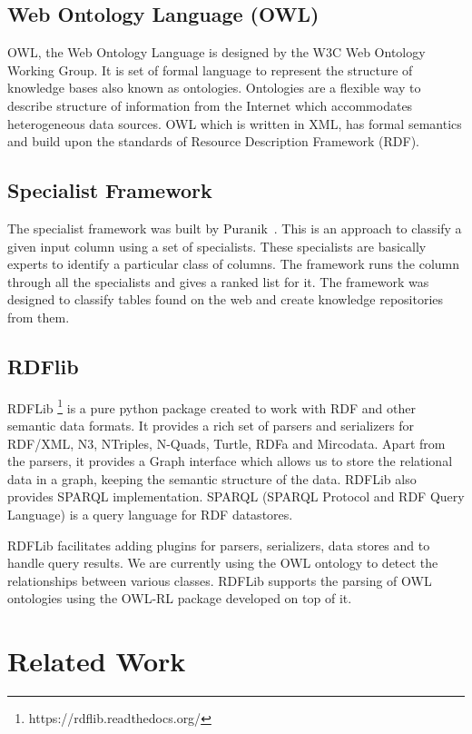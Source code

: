 \subsection{Web Ontology Language (OWL)}

OWL, the Web Ontology Language is designed by the W3C Web Ontology Working Group. It is set of formal language to represent the structure of knowledge bases also known as ontologies. Ontologies are a flexible way to describe structure of information from the Internet which accommodates heterogeneous data sources. OWL which is written in XML, has formal semantics and build upon the standards of Resource Description Framework (RDF).

\subsection{Specialist Framework}

The specialist framework was built by Puranik~\cite{puranik2012specialist}. This is an approach to classify a given input column using a set of specialists. These specialists are basically experts to identify a particular class of columns. The framework runs the column through all the specialists and gives a ranked list for it. The framework was designed to classify tables found on the web and create knowledge repositories from them.

\subsection{RDFlib}

RDFLib \footnote{https://rdflib.readthedocs.org/} is a pure python package created to work with RDF and other semantic data formats. It provides a rich set of parsers and serializers for RDF/XML, N3, NTriples, N-Quads, Turtle, RDFa and Mircodata. Apart from the parsers, it provides a Graph interface which allows us to store the relational data in a graph, keeping the semantic structure of the data. RDFLib also provides SPARQL implementation. SPARQL (SPARQL Protocol and RDF Query Language) is a query language for RDF datastores. 

RDFLib facilitates adding plugins for parsers, serializers, data stores and to handle query results. We are currently using the OWL ontology to detect the relationships between various classes. RDFLib supports the parsing of OWL ontologies using the OWL-RL package developed on top of it.

\section{Related Work}

